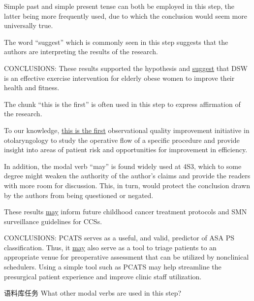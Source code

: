 \documentclass[a4paper]{ctexbook}
\begin{document}
    Simple past and simple present tense can both be employed in this step, the latter being more frequently used, due to which the conclusion would seem more universally true.
    
    The word ``suggest'' which is commonly seen in this step suggests that the authors are interpreting the results of the research.

    \begin{eg}{}
      CONCLUSIONS: These results supported the hypothesis and \uline{suggest} that DSW is an effective exercise intervention for elderly obese women to improve their health and fitness.
    \end{eg}
    
    The chunk ``this is the first'' is often used in this step to express affirmation of the research.

    \begin{eg}{}
      To our knowledge, \uline{this is the first} observational quality improvement initiative in otolaryngology to study the operative flow of a specific procedure and provide insight into areas of patient risk and opportunities for improvement in efficiency.  
    \end{eg}
    
    In addition, the modal verb ``may'' is found widely used at 4S3, which to some degree might weaken the authority of the author's claims and provide the readers with more room for discussion. This, in turn, would protect the conclusion drawn by the authors from being questioned or negated.

    \begin{eg}{}
      These results \uline{may} inform future childhood cancer treatment protocols and SMN surveillance guidelines for CCSs.
    \end{eg}

    \begin{eg}{}
      CONCLUSIONS: PCATS serves as a useful, and valid, predictor of ASA PS classification. Thus, it \uline{may} also serve as a tool to triage patients to an appropriate venue for preoperative assessment that can be utilized by nonclinical schedulers. Using a simple tool such as PCATS may help streamline the presurgical patient experience and improve clinic staff utilization.
    \end{eg}

    \begin{task}{\heiti 语料库任务}
      What other modal verbs are used in this step?
    \end{task}
\end{document}
